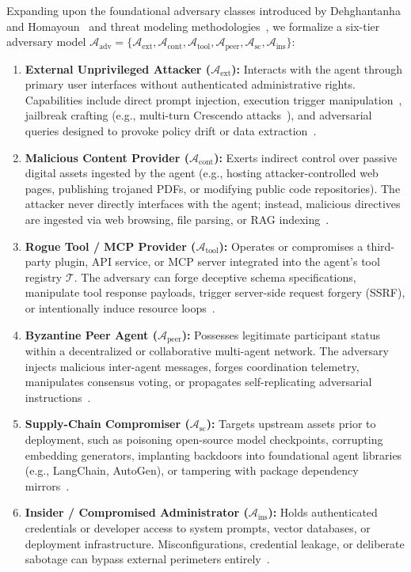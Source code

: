 Expanding upon the foundational adversary classes introduced by Dehghantanha and Homayoun~\cite{dehghantanha2026sok} and threat modeling methodologies~\cite{verma2024operationalizing}, we formalize a six-tier adversary model $\mathcal{A}_{\text{adv}} = \{\mathcal{A}_{\text{ext}}, \mathcal{A}_{\text{cont}}, \mathcal{A}_{\text{tool}}, \mathcal{A}_{\text{peer}}, \mathcal{A}_{\text{sc}}, \mathcal{A}_{\text{ins}}\}$:

\begin{enumerate}
    \item \textbf{External Unprivileged Attacker ($\mathcal{A}_{\text{ext}}$):} Interacts with the agent through primary user interfaces without authenticated administrative rights. Capabilities include direct prompt injection, execution trigger manipulation~\cite{pasquini2024neural}, jailbreak crafting (e.g., multi-turn Crescendo attacks~\cite{russinovich2025great}), and adversarial queries designed to provoke policy drift or data extraction~\cite{abdali2024securing}.
    \item \textbf{Malicious Content Provider ($\mathcal{A}_{\text{cont}}$):} Exerts indirect control over passive digital assets ingested by the agent (e.g., hosting attacker-controlled web pages, publishing trojaned PDFs, or modifying public code repositories). The attacker never directly interfaces with the agent; instead, malicious directives are ingested via web browsing, file parsing, or RAG indexing~\cite{greshake2023not, sutton2024indirect, zou2025poisonedrag}.
    \item \textbf{Rogue Tool / MCP Provider ($\mathcal{A}_{\text{tool}}$):} Operates or compromises a third-party plugin, API service, or MCP server integrated into the agent's tool registry $\mathcal{T}$. The adversary can forge deceptive schema specifications, manipulate tool response payloads, trigger server-side request forgery (SSRF), or intentionally induce resource loops~\cite{liu2024demystifying}.
    \item \textbf{Byzantine Peer Agent ($\mathcal{A}_{\text{peer}}$):} Possesses legitimate participant status within a decentralized or collaborative multi-agent network. The adversary injects malicious inter-agent messages, forges coordination telemetry, manipulates consensus voting, or propagates self-replicating adversarial instructions~\cite{dewitt2025open, gu2024agent, chen2024blockagents}.
    \item \textbf{Supply-Chain Compromiser ($\mathcal{A}_{\text{sc}}$):} Targets upstream assets prior to deployment, such as poisoning open-source model checkpoints, corrupting embedding generators, implanting backdoors into foundational agent libraries (e.g., LangChain, AutoGen), or tampering with package dependency mirrors~\cite{helpnet2023genai, liu2024demystifying}.
    \item \textbf{Insider / Compromised Administrator ($\mathcal{A}_{\text{ins}}$):} Holds authenticated credentials or developer access to system prompts, vector databases, or deployment infrastructure. Misconfigurations, credential leakage, or deliberate sabotage can bypass external perimeters entirely~\cite{vassilev2025adversarial}.
\end{enumerate}

